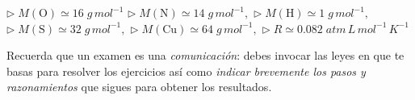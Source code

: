 \documentclass[a4paper,addpoints,14pt]{exam}
\newcommand*\chem[1]{\ensuremath{\mathrm{#1}}}
\begin{document}


\vspace*{\fill}

\begin{learn}
{$\triangleright\; M(\chem{O})\simeq16\;g\,mol^{-1}$\newline
$\triangleright\; M(\chem{N})\simeq14\;g\,mol^{-1},$\newline
$\triangleright\; M(\chem{H})\simeq1\;g\,mol^{-1},$\newline
$\triangleright\; M(\chem{S})\simeq32\;g\,mol^{-1},$\newline
$\triangleright\; M(\chem{Cu})\simeq64\;g\,mol^{-1},$\newline
$\triangleright\; R\simeq 0.082\;atm\,L\,mol^{-1}\,K^{-1}$}
\end{learn}	



\newpage
{}

\vspace*{-1.5cm}

\begin{problemas}{\small Recuerda que un examen es una \textit{comunicación}: debes invocar las leyes en que te basas para resolver los ejercicios así como \textit{indicar brevemente los pasos y razonamientos} que sigues para obtener los resultados.}
\end{problemas}
\vspace{1ex}
\end{document}

